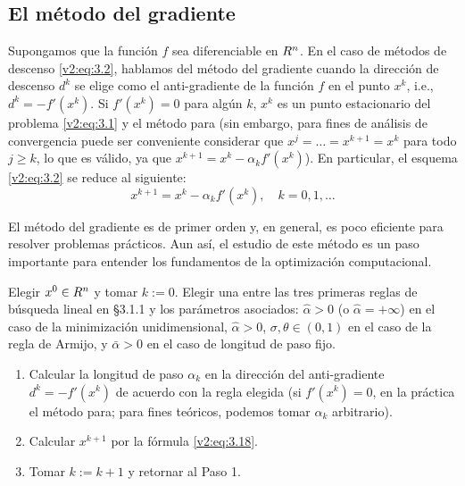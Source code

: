 
\subsection{El método del gradiente}\label{v2:sec:3.1.2}

Supongamos que la función $f$ sea diferenciable en $R^n$. En el caso de métodos de descenso \eqref{v2:eq:3.2}, hablamos del método del gradiente cuando la dirección de descenso $d^k$ se elige como el anti-gradiente de la función $f$ en el punto $x^k$, i.e., $d^k = -f'(x^k)$. Si $f'(x^k) = 0$ para algún $k$, $x^k$ es un punto estacionario del problema \eqref{v2:eq:3.1} y el método para (sin embargo, para fines de análisis de convergencia puede ser conveniente considerar que $x^j = \dots = x^{k+1} = x^k$ para todo $j \ge k$, lo que es válido, ya que $x^{k+1} = x^k - \alpha_k f'(x^k)$). En particular, el esquema \eqref{v2:eq:3.2} se reduce al siguiente:
\begin{equation}
    x^{k+1} = x^k - \alpha_k f'(x^k), \quad k = 0, 1, \dots
    \label{v2:eq:3.18}
\end{equation}

El método del gradiente es de primer orden y, en general, es poco eficiente para resolver problemas prácticos. Aun así, el estudio de este método es un paso importante para entender los fundamentos de la optimización computacional.

\begin{algorithm}\label{v2:alg:3.1.1}
    Elegir $x^0 \in R^n$ y tomar $k := 0$. Elegir una entre las tres primeras reglas de búsqueda lineal en \S 3.1.1 y los parámetros asociados: $\hat{\alpha} > 0$ (o $\hat{\alpha} = +\infty$) en el caso de la minimización unidimensional, $\hat{\alpha} > 0$, $\sigma, \theta \in (0,1)$ en el caso de la regla de Armijo, y $\bar{\alpha} > 0$ en el caso de longitud de paso fijo.
\begin{enumerate}
    \item Calcular la longitud de paso $\alpha_k$ en la dirección del anti-gradiente $d^k = -f'(x^k)$ de acuerdo con la regla elegida (si $f'(x^k) = 0$, en la práctica el método para; para fines teóricos, podemos tomar $\alpha_k$ arbitrario).
    \item Calcular $x^{k+1}$ por la fórmula \eqref{v2:eq:3.18}.
    \item Tomar $k := k + 1$ y retornar al Paso 1.
\end{enumerate}
\end{algorithm}

